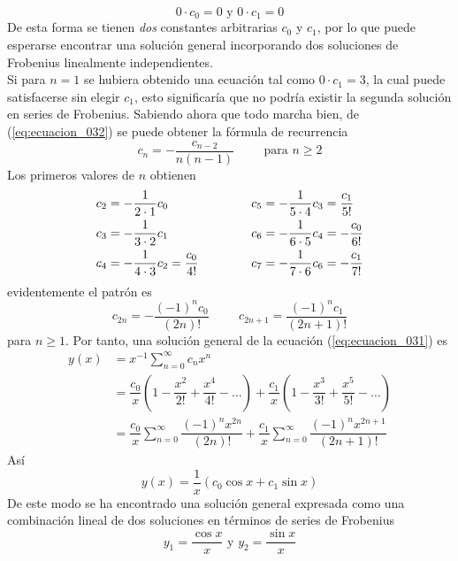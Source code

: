 \[ 0 \cdot c_{0} = 0 \mbox{ y } 0 \cdot c_{1} = 0 \]
De esta forma se tienen \emph{dos} constantes arbitrarias $c_{0}$ y $c_{1}$, por lo que puede esperarse encontrar una solución general incorporando dos soluciones de Frobenius linealmente independientes.
\\
Si para $n = 1$ se hubiera obtenido una ecuación tal como $0 \cdot c_{1} = 3$, la cual puede satisfacerse sin elegir $c_{1}$, esto significaría que no podría existir la segunda solución en series de Frobenius. Sabiendo ahora que todo marcha bien, de (\ref{eq:ecuacion_032}) se puede obtener la fórmula de recurrencia
\begin{equation}
c_{n} = - \dfrac{c_{n-2}}{n(n-1)} \hspace{1cm} \mbox{para } n \geq 2
\label{eq:ecuacion_033}
\end{equation}
Los primeros valores de $n$ obtienen
\begin{eqnarray} \nonumber
\begin{aligned}
c_{2} &= - \dfrac{1}{2 \cdot 1} c_{0} \\
c_{3} &= - \dfrac{1}{3 \cdot 2} c_{1} \\
c_{4} &= - \dfrac{1}{4 \cdot 3} c_{2} = \dfrac{c_{0}}{4!} 
\end{aligned}
\hspace{1.5cm}
\begin{aligned}
c_{5} &= - \dfrac{1}{5 \cdot 4} c_{3} = \dfrac{c_{1}}{5!} \\
c_{6} &= - \dfrac{1}{6 \cdot 5} c_{4} = - \dfrac{c_{0}}{6!} \\
c_{7} &= - \dfrac{1}{7 \cdot 6} c_{6} = - \dfrac{c_{1}}{7!} 
\end{aligned}
\end{eqnarray}
evidentemente el patrón es
\[ c_{2n} = - \dfrac{(-1)^{n} c_{0}}{(2n)!} \hspace{1cm} c_{2n+1} = \dfrac{(-1)^{n} c_{1}}{(2n+1)!} \]
para $n \geq 1$. Por tanto, una solución general de la ecuación (\ref{eq:ecuacion_031}) es
\[ \begin{split}
 y(x) &= x^{-1} \sum_{n=0}^{\infty} c_{n} x^{n} \\
&= \dfrac{c_{0}}{x} \left( 1 - \dfrac{x^{2}}{2!} + \dfrac{x^{4}}{4!} - \ldots \right) + \dfrac{c_{1}}{x} \left( 1 - \dfrac{x^{3}}{3!} + \dfrac{x^{5}}{5!} - \ldots \right) \\
&= \dfrac{c_{0}}{x} \sum_{n=0}^{\infty} \dfrac{(-1)^{n} x^{2n}}{(2n)!} +  \dfrac{c_{1}}{x} \sum_{n=0}^{\infty} \dfrac{(-1)^{n} x^{2n+1}}{(2n+1)!}
\end{split} \] 
Así
\[ y(x) = \dfrac{1}{x}(c_{0} \cos x +  c_{1} \sin x)  \]
De este modo se ha encontrado una solución general expresada como una combinación lineal de dos soluciones en términos de series de Frobenius
\begin{equation}
y_{1} = \dfrac{\cos x }{x} \mbox{ y } y_{2} = \dfrac{\sin x}{x} 
\label{eq:ecuacion_034}
\end{equation}



